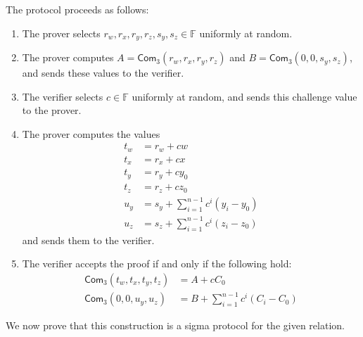 \documentclass{article}
\newcommand{\F}{\mathbb{F}}
\newcommand{\func}[1]{\mathsf{#1}}
\newcommand{\com}{\func{Com}}
\begin{document}
The protocol proceeds as follows:
\begin{enumerate}
    \item The prover selects $r_w, r_x, r_y, r_z, s_y, s_z \in \F$ uniformly at random.
    \item The prover computes $A = \com_3(r_w, r_x, r_y, r_z)$ and $B = \com_3(0, 0, s_y, s_z)$, and sends these values to the verifier.
    \item The verifier selects $c \in \F$ uniformly at random, and sends this challenge value to the prover.
    \item The prover computes the values
    \begin{align*}
        t_w &= r_w + cw \\
        t_x &= r_x + cx \\
        t_y &= r_y + cy_0 \\
        t_z &= r_z + cz_0 \\
        u_y &= s_y + \sum_{i=1}^{n-1} c^i(y_i - y_0) \\
        u_z &= s_z + \sum_{i=1}^{n-1} c^i(z_i - z_0)
    \end{align*}
    and sends them to the verifier.
    \item The verifier accepts the proof if and only if the following hold:
    \begin{align}
        \com_3(t_w, t_x, t_y, t_z) &= A + cC_0 \label{eqn:type-1} \\
        \com_3(0, 0, u_y, u_z) &= B + \sum_{i=1}^{n-1} c^i(C_i - C_0) \label{eqn:type-2}
    \end{align}
\end{enumerate}

We now prove that this construction is a sigma protocol for the given relation.
\end{document}
